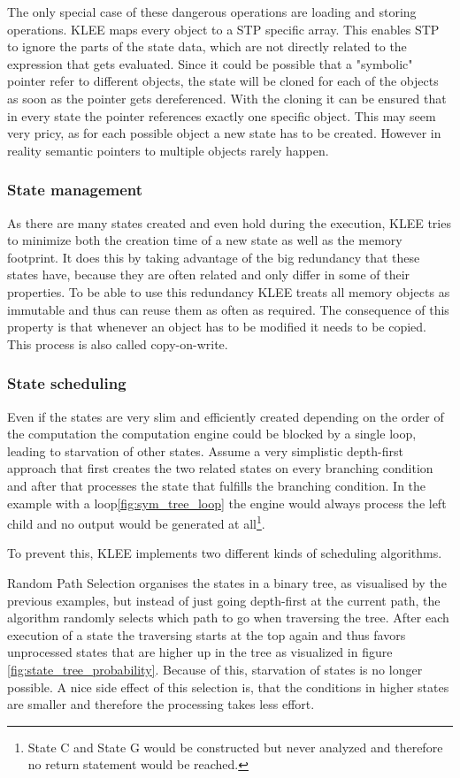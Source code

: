 The only special case of these dangerous operations are loading and storing operations. KLEE maps every object to a STP specific array. This enables STP to ignore the parts of the state data, which are not directly related to the expression that gets evaluated. Since it could be possible that a "symbolic" pointer refer to different objects, the state will be cloned for each of the objects as soon as the pointer gets dereferenced. With the cloning it can be ensured that in every state the pointer references exactly one specific object. This may seem very pricy, as for each possible object a new state has to be created. However in reality semantic pointers to multiple objects rarely happen. 

\subsubsection{State management}
As there are many states created and even hold during the execution, KLEE tries to minimize both the creation time of a new state as well as the memory footprint. It does this by taking advantage of the big redundancy that these states have, because they are often related and only differ in some of their properties. To be able to use this redundancy KLEE treats all memory objects as immutable and thus can reuse them as often as required. The consequence of this property is that whenever an object has to be modified it needs to be copied. This process is also called copy-on-write.

\subsubsection{State scheduling}
Even if the states are very slim and efficiently created depending on the order of the computation the computation engine could be blocked by a single loop, leading to starvation of other states. Assume a very simplistic depth-first approach that first creates the two related states on every branching condition and after that processes the state that fulfills the branching condition. In the example with a loop\ref{fig:sym_tree_loop} the engine would always process the left child and no output would be generated at all\footnote{State C and State G would be constructed but never analyzed and therefore no return statement would be reached.}.

To prevent this, KLEE implements two different kinds of scheduling algorithms. 

Random Path Selection organises the states in a binary tree, as visualised by the previous examples, but instead of just going depth-first at the current path, the algorithm randomly selects which path to go when traversing the tree. After each execution of a state the traversing starts at the top again and thus favors unprocessed states that are higher up in the tree as visualized in figure \ref{fig:state_tree_probability}. Because of this, starvation of states is no longer possible. A nice side effect of this selection is, that the conditions in higher states are smaller and therefore the processing takes less effort.


